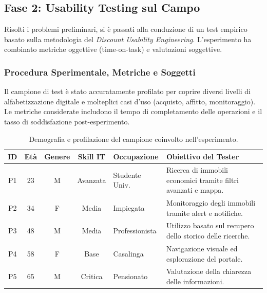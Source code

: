 \documentclass{article}
\begin{document}
\subsection{Fase 2: Usability Testing sul Campo}
Risolti i problemi preliminari, si è passati alla conduzione di un test empirico basato sulla metodologia del \textit{Discount Usability Engineering}. L'esperimento ha combinato metriche oggettive (time-on-task) e valutazioni soggettive.

\subsubsection{Procedura Sperimentale, Metriche e Soggetti}
Il campione di test è stato accuratamente profilato per coprire diversi livelli di alfabetizzazione digitale e molteplici casi d'uso (acquisto, affitto, monitoraggio). Le metriche considerate includono il tempo di completamento delle operazioni e il tasso di soddisfazione post-esperimento.

\begin{table}[h!]
    \centering
    \small
    \begin{tabularx}{\textwidth}{c c c c X X}
        \toprule
        \textbf{ID} & \textbf{Età} & \textbf{Genere} & \textbf{Skill IT} & \textbf{Occupazione} & \textbf{Obiettivo del Tester}                                  \\
        \midrule
        P1          & 23           & M               & Avanzata          & Studente Univ.       & Ricerca di immobili economici tramite filtri avanzati e mappa. \\
        P2          & 34           & F               & Media             & Impiegata            & Monitoraggio degli immobili tramite alert e notifiche.         \\
        P3          & 48           & M               & Media             & Professionista       & Utilizzo basato sul recupero dello storico delle ricerche.     \\
        P4          & 58           & F               & Base              & Casalinga            & Navigazione visuale ed esplorazione del portale.               \\
        P5          & 65           & M               & Critica           & Pensionato           & Valutazione della chiarezza delle informazioni.                \\
        \bottomrule
    \end{tabularx}
    \caption{Demografia e profilazione del campione coinvolto nell'esperimento.}
    \label{tab:usability_users}
\end{table}
\end{document}
